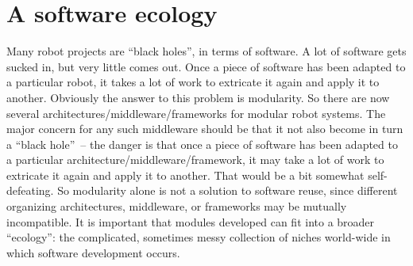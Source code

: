 
\section{A software ecology}




Many robot projects are ``black holes'', in terms of software.  A lot
of software gets sucked in, but very little comes out.  Once a piece
of software has been adapted to a particular robot, it takes a lot
of work to extricate it again and apply it to another.
%
Obviously the answer to this problem is modularity.  So there are 
now several architectures/middleware/frameworks for modular robot systems.
The major concern for any such middleware should be that it not 
also become
in turn a ``black hole''~-- the
danger is that once a piece of software has been adapted
to a particular architecture/middleware/framework, it may take a lot of work to extricate it
again and apply it to another.  That would be a bit somewhat self-defeating.
%
So modularity alone is not a solution to software reuse, since 
different organizing architectures, middleware, or frameworks may be mutually
incompatible.  It is important that modules developed can fit
into a broader ``ecology'': the  complicated, sometimes messy
collection of niches world-wide in which software development occurs.






